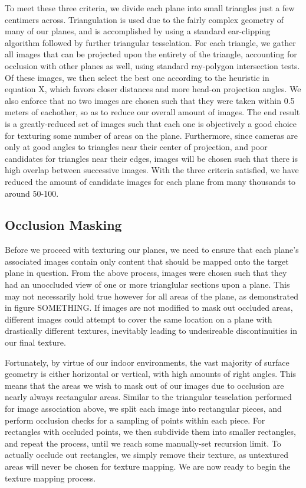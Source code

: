 \documentclass[10pt,twocolumn,letterpaper]{article}
\begin{document}
To meet these three criteria, we divide each plane into small triangles just a few centimers across. Triangulation is used due to the fairly complex
geometry of many of our planes, and is accomplished by using a
standard ear-clipping algorithm followed by further triangular
tesselation. For each triangle, we gather all images that can be
projected upon the entirety of the triangle, accounting for occlusion
with other planes as well, using standard ray-polygon intersection
tests. Of these images, we then select the best one
according to the heuristic in equation X, which favors closer distances
and more head-on projection angles. We also enforce that no two images
are chosen such that they were taken within 0.5 meters of eachother,
so as to reduce our overall amount of images. The end result is a
greatly-reduced set of images such that each one is objectively a good choice for texturing some number of areas on the plane. Furthermore, since cameras are only at good
angles to triangles near their center of projection, and poor
candidates for triangles near their edges, images will be chosen such
that there is high overlap between successive images. With the three criteria satisfied, we have reduced the amount of candidate images for
each plane from many thousands to around 50-100.

\subsection{Occlusion Masking}
Before we proceed with texturing our planes, we need to ensure that
each plane's associated images contain only content that should be
mapped onto the target plane in question. From the above process,
images were chosen such that they had an unoccluded view of one or
more trianglular sections upon a plane. This may not necessarily hold
true however for all areas of the plane, as demonstrated in figure
SOMETHING. If images are not modified to mask out occluded areas,
different images could attempt to cover the same location on a plane
with drastically different textures, inevitably leading to
undesireable discontinuities in our final texture.

Fortunately, by virtue of our indoor environments, the vast majority
of surface geometry is either horizontal or vertical, with high
amounts of right angles. This means that the areas we wish to mask out
of our images due to occlusion are nearly always rectangular
areas. Similar to the triangular tesselation performed for image
association above, we split each image into rectangular pieces, and
perform occlusion checks for a sampling of points within each
piece. For rectangles with occluded points, we then subdivide them
into smaller rectangles, and repeat the process, until we reach some
manually-set recursion limit. To actually occlude out rectangles, we
simply remove their texture, as untextured areas will never be chosen
for texture mapping. We are now ready to begin the texture mapping
process.
\end{document}
